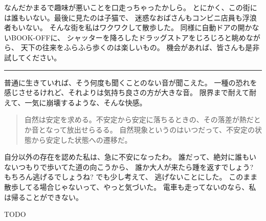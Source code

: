 \documentclass[]{article}
\begin{document}
なんだかまるで趣味が悪いことを口走っちゃったかしら。
とにかく、この街には誰もいない。最後に見たのは子猫で、
迷惑なおばさんもコンビニ店員も浮浪者もいない。
そんな街を私はワクワクして散歩した。
同様に自動ドアの開かないBOOK-OFFに、
シャッターを降ろしたドラッグストアをじろじろと眺めながら、
天下の往来をふらふら歩くのは楽しいもの。
機会があれば、皆さんも是非試してください。

\begin{center}\rule{3in}{0.4pt}\end{center}

普通に生きていれば、そう何度も聞くことのない音が聞こえた。
一種の恐れを感じさせるけれど、それよりは気持ち良さの方が大きな音。
限界まで耐えて耐えて、一気に崩壊するような、そんな快感。

\begin{quote}
自然は安定を求める。不安定から安定に落ちるときの、その落差が熱だとか音となって放出せらるる。
自然現象というのはいつだって、不安定の状態から安定した状態への遷移だ。
\end{quote}

自分以外の存在を認めた私は、急に不安になったわ。
誰だって、絶対に誰もいないつもりで歩いてた道の向こうから、
誰か大人が来たら踵を返すでしょう? もちろん逃げるでしょうね?
でも少し考えて、 逃げないことにした。
このまま散歩してる場合じゃないって、やっと気づいた。
電車も走ってないのなら、私は帰ることができない。

TODO
\end{document}
